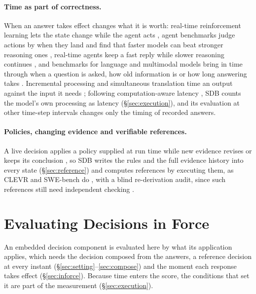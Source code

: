 \documentclass[11pt]{article}
\newcommand{\sdb}{SDB}
\begin{document}
\paragraph{Time as part of correctness.}
When an answer takes effect changes what it is worth: real-time reinforcement learning lets the state change while the agent acts \citep{ramstedt2019real}, agent benchmarks judge actions by when they land and find that faster models can beat stronger reasoning ones \citep{froger2026gaia2,kang2025win,li2026beyond,ma2026timely}, real-time agents keep a fast reply while slower reasoning continues \citep{li2026never,wen2026realtime}, and benchmarks for language and multimodal models bring in time through when a question is asked, how old information is or how long answering takes \citep{lin2024streamingbench,cheng2026your,liu2026streammembench,ding2026proactor}.
Incremental processing and simultaneous translation time an output against the input it needs \citep{baumann2011evaluation,ma2019stacl,ma2020simuleval}; following computation-aware latency \citep{ma2020simulmt}, \sdb{} counts the model's own processing as latency (\S\ref{sec:execution}), and its evaluation at other time-step intervals changes only the timing of recorded answers.

\paragraph{Policies, changing evidence and verifiable references.}
A live decision applies a policy supplied at run time \citep{chakrabarti2025cope} while new evidence revises or keeps its conclusion \citep{wilie2024belief,dhanda2026deltalogic}, so \sdb{} writes the rules and the full evidence history into every state (\S\ref{sec:reference}) and computes references by executing them, as CLEVR and SWE-bench do \citep{johnson2017clevr,jimenez2024swebench}, with a blind re-derivation audit, since such references still need independent checking \citep{chowdhury2024introducing,openai2026why}.

\section{Evaluating Decisions in Force}
\label{sec:method}
An embedded decision component is evaluated here by what its application applies, which needs the decision composed from the answers, a reference decision at every instant (\S\ref{sec:setting}--\ref{sec:compose}) and the moment each response takes effect (\S\ref{sec:inforce}).
Because time enters the score, the conditions that set it are part of the measurement (\S\ref{sec:execution}).
\end{document}
